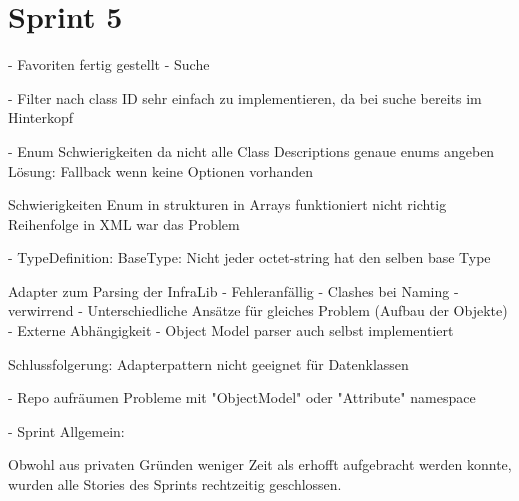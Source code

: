 \section{Sprint 5}


- Favoriten fertig gestellt
- Suche

- Filter nach class ID sehr einfach zu implementieren, da bei suche bereits im Hinterkopf

- Enum
Schwierigkeiten da nicht alle Class Descriptions genaue enums angeben
Lösung: Fallback wenn keine Optionen vorhanden

Schwierigkeiten Enum in strukturen in Arrays funktioniert nicht richtig
Reihenfolge in XML war das Problem


- TypeDefinition:
BaseType:
   Nicht jeder octet-string hat den selben base Type

Adapter zum Parsing der InfraLib
- Fehleranfällig
- Clashes bei Naming
- verwirrend
- Unterschiedliche Ansätze für gleiches Problem (Aufbau der Objekte)
- Externe Abhängigkeit
- Object Model parser auch selbst implementiert

Schlussfolgerung:
Adapterpattern nicht geeignet für Datenklassen

- Repo aufräumen
Probleme mit "ObjectModel" oder "Attribute" namespace



- Sprint Allgemein:

Obwohl aus privaten Gründen weniger Zeit als erhofft aufgebracht werden konnte, wurden alle Stories des Sprints rechtzeitig geschlossen.